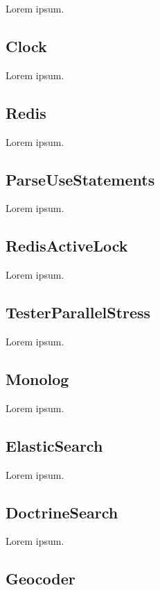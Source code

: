 Lorem ipsum.

\subsection{Clock} \label{sec:state:clock}

Lorem ipsum.

\subsection{Redis} \label{sec:state:redis}

Lorem ipsum.

\subsection{ParseUseStatements} \label{sec:state:parse-use-statements}

Lorem ipsum.

\subsection{RedisActiveLock} \label{sec:state:redis-active-lock}

Lorem ipsum.

\subsection{TesterParallelStress} \label{sec:state:tester-parallel-stress}

Lorem ipsum.

\subsection{Monolog} \label{sec:state:monolog}

Lorem ipsum.

\subsection{ElasticSearch} \label{sec:state:elastic-search}

Lorem ipsum.

\subsection{DoctrineSearch} \label{sec:state:doctrine-search}

Lorem ipsum.

\subsection{Geocoder} \label{sec:state:geocoder}

